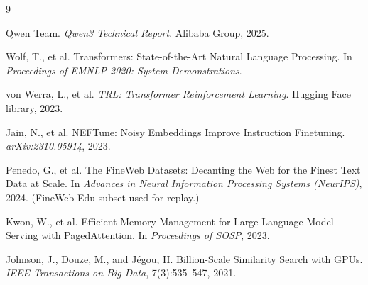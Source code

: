 \documentclass[11pt]{article}
\begin{document}
\begin{thebibliography}{9}

Qwen Team.
\newblock \emph{Qwen3 Technical Report}.
\newblock Alibaba Group, 2025.

Wolf, T., et al.
\newblock Transformers: State-of-the-Art Natural Language Processing.
\newblock In \emph{Proceedings of EMNLP 2020: System Demonstrations}.

von Werra, L., et al.
\newblock \emph{TRL: Transformer Reinforcement Learning}.
\newblock Hugging Face library, 2023.

Jain, N., et al.
\newblock NEFTune: Noisy Embeddings Improve Instruction Finetuning.
\newblock \emph{arXiv:2310.05914}, 2023.

Penedo, G., et al.
\newblock The FineWeb Datasets: Decanting the Web for the Finest Text Data
at Scale.
\newblock In \emph{Advances in Neural Information Processing Systems
(NeurIPS)}, 2024.
\newblock (FineWeb-Edu subset used for replay.)

Kwon, W., et al.
\newblock Efficient Memory Management for Large Language Model Serving
with PagedAttention.
\newblock In \emph{Proceedings of SOSP}, 2023.

Johnson, J., Douze, M., and J\'egou, H.
\newblock Billion-Scale Similarity Search with GPUs.
\newblock \emph{IEEE Transactions on Big Data}, 7(3):535--547, 2021.

\end{thebibliography}
\end{document}
